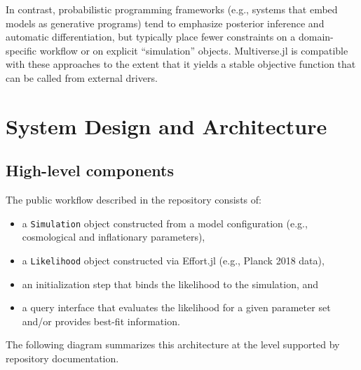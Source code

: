 \documentclass[11pt]{article}
\begin{document}
In contrast, probabilistic programming frameworks (e.g., systems that embed models as generative programs) tend to emphasize posterior inference and automatic differentiation, but typically place fewer constraints on a domain-specific workflow or on explicit ``simulation'' objects.
Multiverse.jl is compatible with these approaches to the extent that it yields a stable objective function that can be called from external drivers.

\section{System Design and Architecture}
\subsection{High-level components}
The public workflow described in the repository consists of:
\begin{itemize}
  \item a \texttt{Simulation} object constructed from a model configuration (e.g., cosmological and inflationary parameters),
  \item a \texttt{Likelihood} object constructed via Effort.jl (e.g., Planck 2018 data),
  \item an initialization step that binds the likelihood to the simulation, and
  \item a query interface that evaluates the likelihood for a given parameter set and/or provides best-fit information.
\end{itemize}

The following diagram summarizes this architecture at the level supported by repository documentation.
\end{document}
